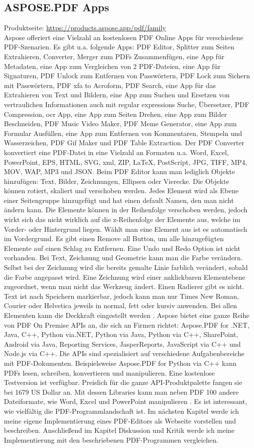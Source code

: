 \subsection{ASPOSE.PDF Apps}
Produktseite: \url{https://products.aspose.app/pdf/family} \\
Aspose offeriert eine Vielzahl an kostenlosen PDF Online Apps für verschiedene PDF-Szenarien. Es gibt u.a. folgende Apps: PDF Editor, Splitter zum Seiten Extrahieren, Converter, Merger zum PDFs Zusammenfügen, eine App für Metadaten, eine App zum Vergleichen von 2 PDF-Dateien, eine App für Signaturen, PDF Unlock zum Entfernen von Passwörtern, PDF Lock zum Sichern mit Passwörtern, PDF \gls{xfa} to Acroform, PDF Search, eine App für das Extrahieren von Text und Bildern, eine App zum Suchen und Ersetzen von vertraulichen Informationen auch mit regular expressions Suche, Übersetzer, PDF Compression, \gls{ocr} App, eine App zum Seiten Drehen, eine App zum Bilder Beschneiden, PDF Music Video Maker, PDF Meme Generator, eine App zum Formular Ausfüllen, eine App zum Entfernen von Kommentaren, Stempeln und Wasserzeichen, PDF Gif Maker und PDF Table Extraction. Der PDF Converter konvertiert eine PDF-Datei in eine Vielzahl an Formaten u.a. Word, Excel, PowerPoint, EPS, HTML, SVG, \gls{xml}, ZIP, LaTeX, PostScript, JPG, TIFF, MP4, MOV, WAP, MP3 und JSON. Beim PDF Editor kann man lediglich Objekte hinzufügen: Text, Bilder, Zeichnungen, Ellipsen oder Vierecke. Die Objekte können rotiert, skaliert und verschoben werden. Jedes Element wird als Ebene einer Seitengruppe hinzugefügt und hat einen default Namen, den man nicht ändern kann. Die Elemente können in der Reihenfolge verschoben werden, jedoch wirkt sich das nicht wirklich auf die z-Reihenfolge der Elemente aus, welche im Vorder- oder Hintergrund liegen. Wählt man eine Element aus ist es automatisch im Vordergrund. Es gibt einen Remove all Button, um alle hinzugefügten Elemente auf einen Schlag zu Entfernen. Eine Undo und Redo Option ist nicht vorhanden. Bei Text, Zeichnung und Geometrie kann man die Farbe verändern. Selbst bei der Zeichnung wird die bereits gemalte Linie farblich verändert, sobald die Farbe angepasst wird. Eine Zeichnung wird einer anklickbaren Elementebene zugeordnet, wenn man nicht das Werkzeug ändert. Einen Radierer gibt es nicht. Text ist nach Speichern markierbar, jedoch kann man nur Times New Roman, Courier oder Helvetica jeweils in normal, fett oder kursiv anwenden. Bei allen Elementen kann die Deckkraft eingestellt werden \cite{aspose-pdf}. Aspose bietet eine ganze Reihe von PDF On Premise APIs an, die sich an Firmen richtet: Aspose.PDF for .NET, Java, C++, Python via.NET, Python via Java, Python via C++, SharePoint, Android via Java, Reporting Services, JasperReports, JavaScript via C++ und Node.js via C++. Die APIs sind spezialisiert auf verschiedene Aufgabenbereiche mit PDF-Dokumenten. Beispielsweise Aspose.PDF for Python via C++ kann PDFs lesen, schreiben, konvertieren und manipulieren. Eine kostenlose Testversion ist verfügbar. Preislich für die ganze API-Produktpalette fangen sie bei 1679 US Dollar an. Mit dessen Libraries kann man neben PDF 100 andere Dateiformate, wie Word, Excel und PowerPoint manipulieren \cite{aspose-api}. Es ist interessant, wie vielfältig die PDF-Programmlandschaft ist. Im nächsten Kapitel werde ich meine eigene Implementierung eines PDF-Editors als Webseite vorstellen und beschreiben. Anschließend im Kapitel Diskussion und Kritik werde ich meine Implementierung mit den beschriebenen PDF-Programmen vergleichen. 

